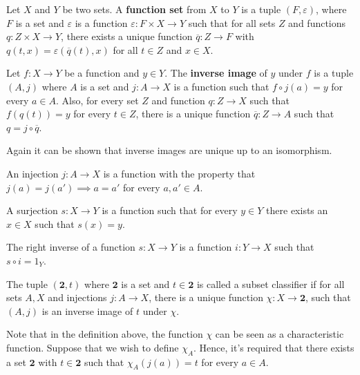 \begin{definition}
    Let $X$ and $Y$ be two sets. A \textbf{function set} from
    $X$ to $Y$ is a tuple $(F, \varepsilon)$, where $F$ is a set and $\varepsilon$
    is a function $\varepsilon: F \times X \to Y$ such that
    for all sets $Z$ and functions $q:Z \times X \to Y$, 
    there exists a unique function $\overline q: Z \to F$ with
    $q(t,x) = \varepsilon(\overline q(t), x)$ for all $t \in Z$
    and $x \in X$.
\end{definition}

\begin{definition}
    Let $f: X \to Y$ be a function and $y \in Y$. The \textbf{inverse image}
    of $y$ under $f$ is a tuple $(A, j)$ where $A$ is a set and $j:A \to X$
    is a function such that $f \circ j (a) = y$ for every $a \in A$. Also,
    for every set $Z$ and function $q : Z \to X$ such that 
    $f(q(t)) = y$ for every $t \in Z$, there is a unique function
    $\overline q : Z \to A$ such that $q = j \circ \overline q$.
\end{definition}
Again it can be shown that inverse images are unique up to an isomorphism.

\begin{definition}[Injection]
    An injection $j:A \to X$ is a function with the property that
    $j(a) = j(a') \implies a = a'$ for every $a,a' \in A$.
\end{definition}

\begin{definition}[Surjection]
    A surjection $s:X \to Y$ is a function such that for every
    $y \in Y$ there exists an $x \in X$ such that $s(x)=y$.
\end{definition}

\begin{definition}
    The right inverse of a function $s:X \to Y$ is a function
    $i : Y \to X$ such that $s \circ i = 1_Y$.
\end{definition}

\begin{definition}
    The tuple $(\bm{2}, t)$ where $\bm 2$ is a set and $t \in \bm 2$ is called
    a subset classifier if for all sets $A, X$ and injections
    $j : A \to X$, there is a unique function $\chi : X \to \bm 2$,
    such that $(A,j)$ is an inverse image of $t$ under $\chi$.
\end{definition}
Note that in the definition above, the function $\chi$ can be seen as a characteristic
function. Suppose that we wish to define $\chi_A$. Hence, it's required that there exists
a set $\bm 2$ with $t \in \bm 2$ such that $\chi_A(j(a)) = t$ for every $a \in A$.

